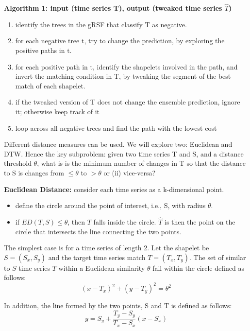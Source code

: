 \documentclass[smallextended,natbib]{svjour3}
\begin{document}
\smallskip
\noindent
\textbf{Algorithm 1: input (time series T), output (tweaked time series $\hat{T}$)}
\begin{enumerate}
    \item identify the trees in the gRSF that classify T as negative.
    \item for each negative tree t, try to change the prediction, by exploring the positive paths in t.
    \item for each positive path in t, identify the shapelets involved in the path, and invert the matching condition in T, by tweaking the segment of the best match of each shapelet.
    \item if the tweaked version of T does not change the ensemble prediction, ignore it; otherwise keep track of it
    \item loop across all negative trees and find the path with the lowest cost
\end{enumerate}

Different distance measures can be used. We will explore two: Euclidean and DTW. Hence the key subproblem: given two time series T and S, and a distance threshold $\theta$, what is is the minimum number of changes in T so that the distance to S is changes from $\leq \theta$ to $> \theta$ or (ii) vice-versa?

\smallskip
\noindent
\textbf{Euclidean Distance:} consider each time series as a k-dimensional point.
\begin{itemize}
    \item define the circle around the point of interest, i.e., S, with radius $\theta$.
    \item if $ED(T,S) \leq \theta$, then $T$ falls inside the circle. $\hat{T}$ is then the point on the circle that intersects the line connecting the two points.
\end{itemize}

The simplest case is for a time series of length 2. Let the shapelet be $S=(S_x, S_y)$ and the target time series match $T=(T_x,T_y)$. The set of similar to $S$ time series $T$ within a Euclidean similarity $\theta$ fall within the circle defined as follows:
\begin{equation}
\label{eq:circle}
   (x-T_x)^2+ (y-T_y)^2 = \theta^2 
\end{equation}

In addition, the line formed by the two points, S and T is defined as follows:
\begin{equation}
\label{eq:line}
   y = S_y + \frac{T_y-S_y}{T_x-S_x} (x-S_x)
\end{equation}
\end{document}
